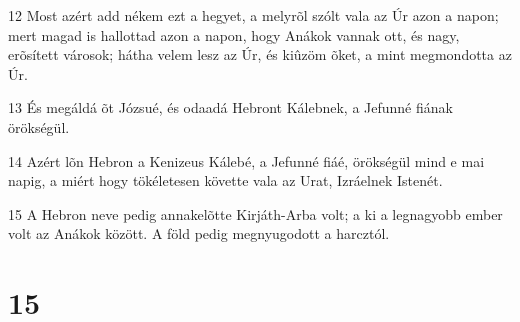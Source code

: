 \par 12 Most azért add nékem ezt a hegyet, a melyrõl szólt vala az Úr azon a napon; mert magad is hallottad azon a napon, hogy Anákok vannak ott, és nagy, erõsített városok; hátha velem lesz az Úr, és kiûzöm õket, a mint megmondotta az Úr.
\par 13 És megáldá õt Józsué, és odaadá Hebront Kálebnek, a Jefunné fiának örökségül.
\par 14 Azért lõn Hebron a Kenizeus Kálebé, a Jefunné fiáé, örökségül mind e mai napig, a miért hogy tökéletesen követte vala az Urat, Izráelnek Istenét.
\par 15 A Hebron neve pedig annakelõtte Kirjáth-Arba volt; a ki a legnagyobb ember volt az Anákok között. A föld pedig megnyugodott  a harcztól.

\chapter{15}

